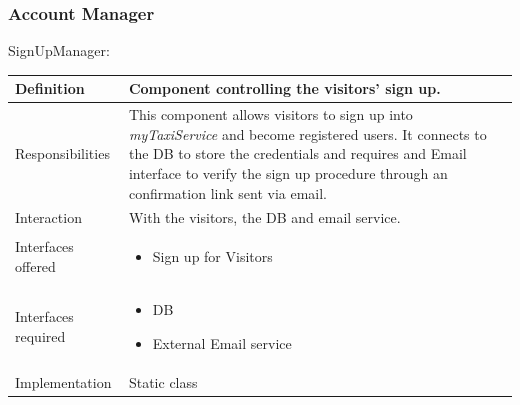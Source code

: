 \documentclass[a4paper,11pt]{report} %
\newcommand{\mts}{\mbox{\normalfont\itshape myTaxiService}}
\begin{document}
	\subsubsection{Account Manager}
	\begin{minipage}{\linewidth}
	\end{minipage} \linebreak
	\centerline{SignUpManager:}	
	\begin{center}
		\begin{tabular}{| l | p{9cm} |}\hline
			Definition & Component controlling the visitors' sign up.\\\hline
			Responsibilities & This component allows visitors to sign up into \mts{} and become registered users. It connects to the DB to store the credentials and requires and Email interface to verify the sign up procedure through an confirmation link sent via email.\\\hline
			Interaction & With the visitors, the DB and email service.\\\hline
			Interfaces offered & \begin{itemize}
				\item Sign up for Visitors
			\end{itemize}\\\hline
			Interfaces required & \begin{itemize}
				\item DB 
				\item External Email service
			\end{itemize}\\\hline
			Implementation & Static class\\\hline
		\end{tabular}
	\end{center}
	
\end{document}
